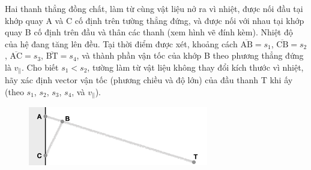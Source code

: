 Hai thanh thẳng đồng chất, làm từ cùng vật liệu nở ra vì nhiệt, được nối đầu tại khớp quay A và C cố định trên tường thẳng đứng, và được nối với nhau tại khớp quay B cố định trên đầu và thân các thanh (xem hình vẽ đính kèm). Nhiệt độ của hệ đang tăng lên đều. Tại thời điểm được xét, khoảng cách $\overline{\text{AB}}=s_1$, $\overline{\text{CB}}=s_2$, $\overline{\text{AC}}=s_3$, $\overline{\text{BT}}=s_4$, và thành phần vận tốc của khớp B theo phương thẳng đứng là $v_{\parallel}$. Cho biết $s_1<s_2$, tường làm từ vật liệu không thay đổi kích thước vì nhiệt, hãy xác định vector vận tốc (phương chiều và độ lớn) của đầu thanh T khi ấy (theo $s_1$, $s_2$, $s_3$, $s_4$, và $v_\parallel$).

\begin{figure}[ht]
\centering
\includegraphics[width=0.7\textwidth,keepaspectratio]{Problem_3/Figs/P3.png}
\end{figure}